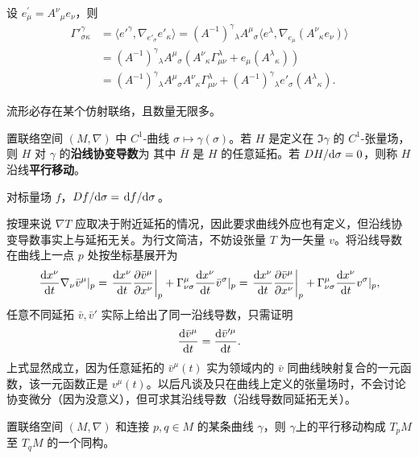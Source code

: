 \begin{theorem}
    设 $e_\mu^{\prime}=A^\nu{ }_\mu e_\nu$，则
    \begin{align*}
        \Gamma'^{\gamma}_{\sigma\kappa}&=\langle e'^\gamma,\nabla_{e'_\sigma} e'_\kappa\rangle=(A^{-1})^\gamma{}_\lambda A^\mu{}_\sigma\langle e^\lambda,\nabla_{e_\mu} (A^\nu{}_\kappa e_\nu)\rangle\\
    &=(A^{-1})^\gamma{}_\lambda A^\mu{}_\sigma(A^\nu{}_\kappa\Gamma^\lambda_{\mu\nu}+e_\mu(A^\lambda{}_\kappa))\\
    &=(A^{-1})^\gamma{}_\lambda A^\mu{}_\sigma A^\nu{}_\kappa\Gamma^\lambda_{\mu\nu}+(A^{-1})^\gamma{}_\lambda e'_\sigma(A^\lambda{}_\kappa).
    \end{align*}
\end{theorem}

\begin{theorem}
    流形必存在某个仿射联络，且数量无限多。
\end{theorem}


\begin{definition}
    置联络空间 $(M,\nabla)$ 中 $C^1$-曲线 $\sigma\mapsto\gamma(\sigma)$。若 $H$ 是定义在 $\Im\gamma$ 的 $C^1$-张量场，则 $H$ 对 $\gamma$ 的\textbf{沿线协变导数}为
其中 $\bar H$ 是 $H$ 的任意延拓。若 $D H/\dd\sigma=0$，则称 $H$ 沿线\textbf{平行移动}。
\end{definition}

\begin{eg}
    对标量场 $f$，$D f/\dd\sigma=\dv*{f}{\sigma}$。
\end{eg}

按理来说 $\nabla T$ 应取决于附近延拓的情况，因此要求曲线外应也有定义，但沿线协变导数事实上与延拓无关。为行文简洁，不妨设张量 $T$ 为一矢量 $v$。将沿线导数在曲线上一点 $p$ 处按坐标基展开为
    \[
    \dv{x^\nu}{t}\nabla_\nu \bar v^\mu|_p=\eval{\dv{x^\nu}{t}\pdv{\bar v^\mu}{x^\nu}}_p +\Gamma^\mu_{\nu\sigma}\dv{x^\nu}{t}\bar v^\sigma|_p=\eval{\dv{x^\nu}{t}\pdv{\bar v^\mu}{x^\nu}}_p +\Gamma^\mu_{\nu\sigma}\dv{x^\nu}{t} v^\sigma|_p,
    \]
    任意不同延拓 $\bar v,\bar v'$ 实际上给出了同一沿线导数，只需证明
    \[
    \dv{\bar v^\mu}{t}=\dv{\bar v'^\mu}{t}.
    \]
    上式显然成立，因为任意延拓的 $\bar v^\mu(t)$ 实为领域内的 $\bar v$ 同曲线映射复合的一元函数，该一元函数正是 $v^\mu(t)$。以后凡谈及只在曲线上定义的张量场时，不会讨论协变微分（因为没意义），但可求其沿线导数（沿线导数同延拓无关）。

\begin{theorem}
    置联络空间 $(M,\nabla)$ 和连接 $p,q\in M$ 的某条曲线 $\gamma$，则 $\gamma$上的平行移动构成 $T_p M$ 至 $T_q M$ 的一个同构。
\end{theorem}

